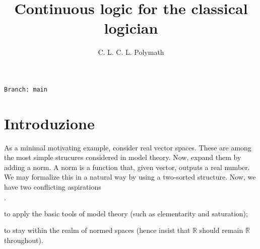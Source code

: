 \documentclass[11pt,oneside]{amsart}
\author{C. L. C. L. Polymath}
\newcommand{\mylabel}[1]{{#1}\hfill}
\renewenvironment{itemize}
  {\begin{list}{$\cdot$}{%
  \setlength{\parskip}{0mm}
  \setlength{\topsep}{.2\baselineskip}
  \setlength{\rightmargin}{0mm}
  \setlength{\listparindent}{0mm}
  \setlength{\itemindent}{0mm}
  \setlength{\labelwidth}{3ex}
  \setlength{\itemsep}{.2\baselineskip}
  \setlength{\parsep}{.2\baselineskip}
  \setlength{\partopsep}{0mm}
  \setlength{\labelsep}{1ex}
  \setlength{\leftmargin}{\labelwidth+\labelsep}
  \let\makelabel\mylabel}}{%
\end{list}}
\begin{document}
\title{Continuous logic for the classical logician}
\hfill\texttt{Branch:\ main\ \DTMnow}\bigskip
\maketitle
\raggedbottom

\def\forallM{\forall\raisebox{1.1ex}{\scaleto{\sf M}{.8ex}\kern-.2ex}}
\def\existsM{\exists\raisebox{1.1ex}{\scaleto{\sf M}{.8ex}\kern-.2ex}}
\def\forallR{\forall\raisebox{1.1ex}{\scaleto{\sf R}{.8ex}\kern-.2ex}}
\def\existsR{\exists\raisebox{1.1ex}{\scaleto{\sf R}{.8ex}\kern-.2ex}}

\newcommand\questionsign[1][2ex]{%
  \renewcommand\stacktype{L}%
  \scaleto{\stackon[-.6pt]{\color{red}$\triangle$}{\color{red}\bfseries\small ?}}{#1}%
}

\newcommand\dangersign[1][2ex]{%
  \renewcommand\stacktype{L}%
  \scaleto{\stackon[-.6pt]{\color{red}$\triangle$}{\color{red}\bfseries\small !}}{#1}%
}


\section{Introduzione}\label{intro}


\def\ceq#1#2#3{\parbox[t]{23ex}{$\displaystyle #1$}\parbox{6ex}{\hfil $#2$}{$\displaystyle #3$}}

As a minimal motivating example, consider real vector spaces.
These are among the most simple strucures considered in model theory.
Now, expand them by adding a norm.
A norm is a function that, given vector, outputs a real number.
We may formalize this in a natural way by using a two-sorted structure.
Now, we have two conflicting aspirations
\begin{itemize}
  \item[i.] to apply the basic tools of model theory (such as elementarity and saturation);
  \item[ii.] to stay within the realm of normed spaces (hence insist that 
  $\mathds{R}$ should remain $\mathds{R}$ throughout).
\end{itemize}
\end{document}
